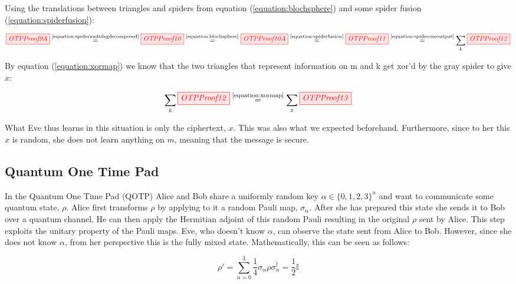 \documentclass[]{article}
\newcommand{\equaltext}[1]{\ensuremath{\stackrel{\text{#1}}{=}}}
\begin{document}
Using the translations between triangles and spiders from equation (\ref{equation:blochsphere}) and some spider fusion (\ref{equation:spiderfusion}):

\begin{equation}
\tikzfig{OTPProof9A} \equaltext{\ref{equation:spidermultilegdecomposed}} \tikzfig{OTPProof10} \equaltext{\ref{equation:blochsphere}} \tikzfig{OTPProof10A} \equaltext{\ref{equation:spiderfusion}} \tikzfig{OTPProof11} \equaltext{\ref{equation:spideroneoutput}} \sum\limits_{k} \tikzfig{OTPProof12}
\end{equation}

By equation (\ref{equation:xormap}) we know that the two triangles that represent information on m and k get xor'd by the gray spider to give $x$:

\begin{equation}
\sum\limits_{k} \tikzfig{OTPProof12} \equaltext{\ref{equation:xormap}} \sum\limits_{x} \tikzfig{OTPProof13}
\end{equation}

What Eve thus learns in this situation is only the ciphertext, $x$. This was also what we expected beforehand. Furthermore, since to her this $x$ is random, she does not learn anything on $m$, meaning that the message is secure.

\subsection{Quantum One Time Pad}
\label{QOTP}
In the Quantum One Time Pad (QOTP) Alice and Bob share a uniformly random key $ \alpha \in \{0,1,2,3\}^n$ and want to communicate some quantum state, $\rho$. Alice first transforms $\rho$ by applying to it a random Pauli map, $\sigma_\alpha$. After she has prepared this state she sends it to Bob over a quantum channel. He can then apply the Hermitian adjoint of this random Pauli resulting in the original $\rho$ sent by Alice. This step exploits the unitary property of the Pauli maps. Eve, who doesn't know $\alpha$, can observe the state sent from Alice to Bob. However, since she does not know $\alpha$, from her perspective this is the fully mixed state. Mathematically, this can be seen as follows:

\begin{equation}
	\label{equation:OTPsecurity}
	\rho' = \sum\limits_{\alpha = 0}^3 \frac{1}{4} \sigma_\alpha \rho \sigma_\alpha^\dagger = \frac{1}{2}\mathbb{I}
\end{equation}
\end{document}
